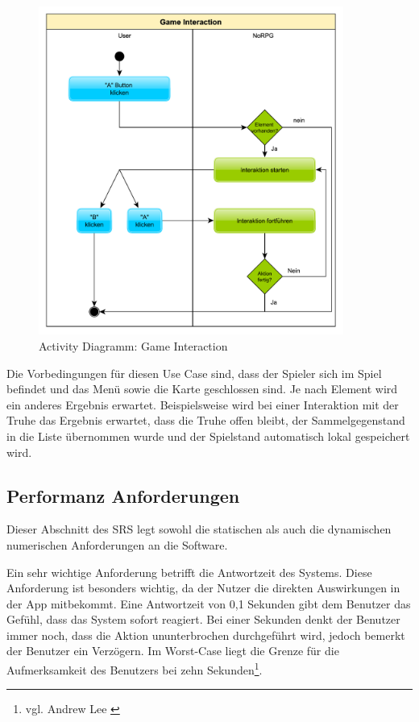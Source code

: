 			\begin{figure}[htbp]
				\centering 
				\label{umlInteraction}
				\includegraphics[width=10cm]{pics/GameInteraction.pdf}
				\caption{Activity Diagramm: Game Interaction}
			\end{figure}
			
			Die Vorbedingungen für diesen Use Case sind, dass der Spieler sich im Spiel befindet und das Menü sowie die Karte geschlossen sind. Je nach Element wird ein anderes Ergebnis erwartet. Beispielsweise wird bei einer Interaktion mit der Truhe das Ergebnis erwartet, dass die Truhe offen bleibt, der Sammelgegenstand in die Liste übernommen wurde und der Spielstand automatisch lokal gespeichert wird.
	
	\subsection{Performanz Anforderungen}
		Dieser Abschnitt des \ac{SRS} legt sowohl die statischen als auch die dynamischen numerischen Anforderungen an die Software. 
	
		Ein sehr wichtige Anforderung betrifft die Antwortzeit des Systems. Diese Anforderung ist besonders wichtig, da der Nutzer die direkten Auswirkungen in der App mitbekommt. Eine Antwortzeit von 0,1 Sekunden gibt dem Benutzer das Gefühl, dass das System sofort reagiert. Bei einer Sekunden denkt der Benutzer immer noch, dass die Aktion ununterbrochen durchgeführt wird, jedoch bemerkt der Benutzer ein Verzögern. Im Worst-Case liegt die Grenze für die Aufmerksamkeit des Benutzers bei zehn Sekunden\footnote{vgl. Andrew Lee \cite{performance1}}.
		
